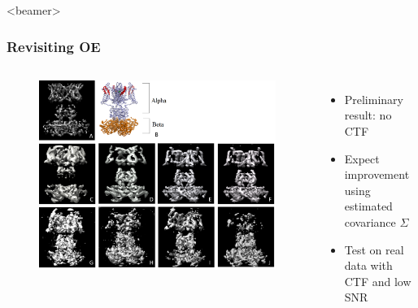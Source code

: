 \documentclass{beamer}
\begin{document}
\begin{frame}<beamer>
\frametitle{Revisiting OE}
 \begin{columns}
\begin{figure}[!htbp]
\begin{center}
\includegraphics[width=.95 \columnwidth]{figures/reconstruction_all.png}
\end{center}
\end{figure}
\begin{itemize}
\item Preliminary result: no CTF
\item Expect improvement using estimated covariance $\Sigma$
\item Test on real data with CTF and low SNR
\end{itemize}
\end{columns}
\end{frame}
\end{document}
